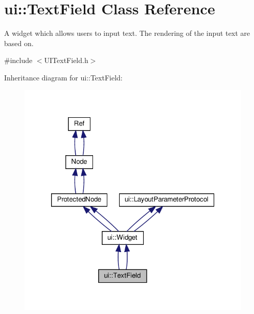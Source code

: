 \hypertarget{classui_1_1TextField}{}\section{ui\+:\+:Text\+Field Class Reference}
\label{classui_1_1TextField}


A widget which allows users to input text. The rendering of the input text are based on.  




{\ttfamily \#include $<$U\+I\+Text\+Field.\+h$>$}



Inheritance diagram for ui\+:\+:Text\+Field\+:
\nopagebreak
\begin{figure}[H]
\begin{center}
\leavevmode
\includegraphics[width=320pt]{classui_1_1TextField__inherit__graph}
\end{center}
\end{figure}


